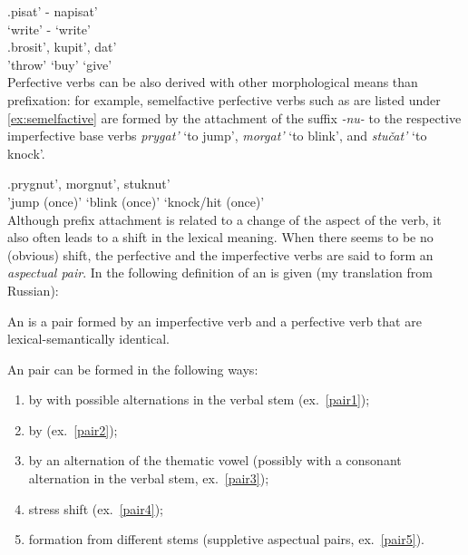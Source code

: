\exg.\label{ex:asppair}pisat'\textsuperscript{\IPF} - napisat'\textsuperscript{\PF}\\
`write' - `write'\\

\exg.\label{ex:unprefperf}brosit'\textsuperscript{\PF}, kupit'\textsuperscript{\PF}, dat'\textsuperscript{\PF}\\
'throw' `buy' `give'\\

Perfective verbs can be also derived with other morphological means than prefixation: for example, semelfactive perfective verbs  such as are listed under \ref{ex:semelfactive} are formed by the attachment of the suffix \textit{-nu-} to the respective imperfective base verbs \textit{prygat'} `to jump', \textit{morgat'} `to blink', and \textit{stu\v{c}at'} `to knock'.

\exg.\label{ex:semelfactive}prygnut'\textsuperscript{\PF}, morgnut'\textsuperscript{\PF}, stuknut'\textsuperscript{\PF}\\
{'jump (once)'} {`blink (once)'} {`knock/hit (once)'}\\

Although prefix attachment is related to a change of the aspect of the verb, it also often leads to a shift in the lexical meaning. When there seems to be no (obvious) shift, the perfective and the imperfective verbs are said to form an \textit{aspectual pair}. In \cite{Rosenthal:76} the following definition of an  is given (my translation from Russian):
\begin{definition}\label{def:pair}
An  is a pair formed by an imperfective verb and a perfective verb that are lexical-semantically identical.
\end{definition}
\noindent An   pair can be formed in the following ways:

\begin{enumerate}[noitemsep]
\item by  with possible alternations in the verbal stem (ex.~\ref{pair1});
\item by  (ex.~\ref{pair2});
\item by an alternation of the thematic vowel (possibly with a consonant alternation in the verbal stem, ex.~\ref{pair3});
\item stress shift (ex.~\ref{pair4});
\item formation from different stems (suppletive aspectual pairs, ex.~\ref{pair5}).
\end{enumerate}

